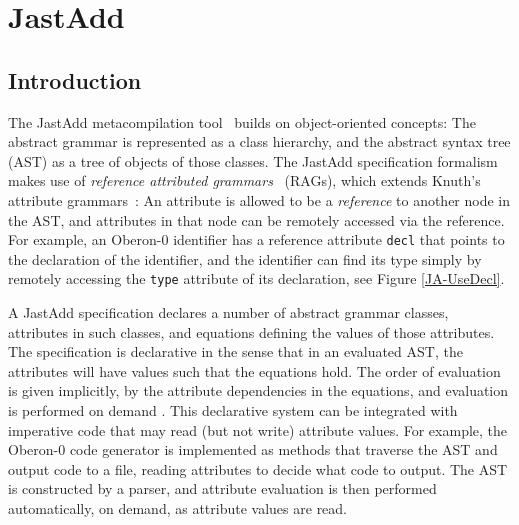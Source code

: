 	{\lstset{
		basicstyle=\footnotesize\ttfamily,
		keywordstyle=\ttfamily\bfseries,
		commentstyle=\itshape\sffamily,
		tabsize=4,
		xleftmargin=0.2cm, %
		basewidth=0.6em,
		fontadjust= true,
		lineskip=0.7pt,
		aboveskip=\baselineskip,
		belowskip=\baselineskip,
		frame=tb,
		showspaces=false,
		showtabs=false,
		framerule=0.5pt,
		framexleftmargin=0.2cm,
		numbers=none,
		}
	}
	{}

\section{JastAdd}

%
%
\subsection{Introduction}
The JastAdd metacompilation tool~\cite{magnusson03scp} builds on object-oriented concepts: The abstract grammar is represented as a class hierarchy, and the abstract syntax tree (AST) as a tree of objects of those classes. The JastAdd specification formalism makes use of \emph{reference attributed grammars}~\cite{hedin00informatica} (RAGs), which extends Knuth's attribute grammars~\cite{knuth68mst}: An attribute is allowed to be a \emph{reference} to another node in the AST, and attributes in that node can be remotely accessed via the reference. For example, an Oberon-0 identifier has a reference attribute \texttt{decl} that points to the declaration of the identifier, and the identifier can find its type simply by remotely accessing the \texttt{type} attribute of its declaration, see Figure \ref{JA-UseDecl}.

A JastAdd specification declares a number of abstract grammar classes, attributes in such classes, and equations defining the values of those attributes. The specification is declarative in the sense that in an evaluated AST, the attributes will have values such that the equations hold. The order of evaluation is given implicitly, by the attribute dependencies in the equations, and evaluation is performed on demand \cite{jourdan84isp}. This declarative system can be integrated with imperative code that may read (but not write) attribute values. For example, the Oberon-0 code generator is implemented as methods that traverse the AST and output code to a file, reading attributes to decide what code to output. The AST is constructed by a parser, and attribute evaluation is then performed automatically, on demand, as attribute values are read.

